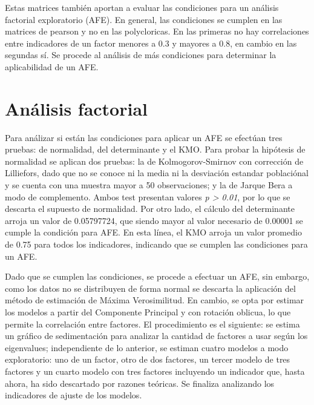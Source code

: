 \documentclass[12pt,twoside]{templates/facsothesis}
\begin{document}
Estas matrices también aportan a evaluar las condiciones para un análisis factorial exploratorio (AFE). En general, las condiciones se cumplen en las matrices de pearson y no en las polycloricas. En las primeras no hay correlaciones entre indicadores de un factor menores a 0.3 y mayores a 0.8, en cambio en las segundas sí. Se procede al análisis de más condiciones para determinar la aplicabilidad de un AFE.

\hypertarget{anuxe1lisis-factorial}{%
\section{Análisis factorial}\label{anuxe1lisis-factorial}}

Para análizar si están las condiciones para aplicar un AFE se efectúan tres pruebas: de normalidad, del determinante y el KMO. Para probar la hipótesis de normalidad se aplican dos pruebas: la de Kolmogorov-Smirnov con corrección de Lilliefors, dado que no se conoce ni la media ni la desviación estandar poblaciónal y se cuenta con una muestra mayor a 50 observaciones; y la de Jarque Bera a modo de complemento. Ambos test presentan valores \emph{p \textgreater{} 0.01}, por lo que se descarta el supuesto de normalidad. Por otro lado, el cálculo del determinante arroja un valor de 0.05797724, que siendo mayor al valor necesario de 0.00001 se cumple la condición para AFE. En esta línea, el KMO arroja un valor promedio de 0.75 para todos los indicadores, indicando que se cumplen las condiciones para un AFE.

Dado que se cumplen las condiciones, se procede a efectuar un AFE, sin embargo, como los datos no se distribuyen de forma normal se descarta la aplicación del método de estimación de Máxima Verosimilitud. En cambio, se opta por estimar los modelos a partir del Componente Principal y con rotación oblicua, lo que permite la correlación entre factores. El procedimiento es el siguiente: se estima un gráfico de sedimentación para analizar la cantidad de factores a usar según los eigenvalues; independiente de lo anterior, se estiman cuatro modelos a modo exploratorio: uno de un factor, otro de dos factores, un tercer modelo de tres factores y un cuarto modelo con tres factores incluyendo un indicador que, hasta ahora, ha sido descartado por razones teóricas. Se finaliza analizando los indicadores de ajuste de los modelos.
\end{document}

